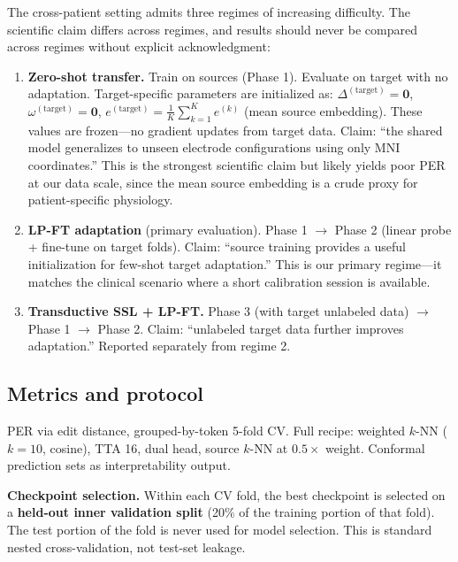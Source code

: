\documentclass[11pt,letterpaper]{article}
\begin{document}
The cross-patient setting admits three regimes of increasing difficulty. The scientific claim differs across regimes, and results should never be compared across regimes without explicit acknowledgment:

\begin{enumerate}[leftmargin=2em]
\item \textbf{Zero-shot transfer.} Train on sources (Phase 1). Evaluate on target with no adaptation. Target-specific parameters are initialized as: $\Delta^{(\text{target})} = \mathbf{0}$, $\omega^{(\text{target})} = \mathbf{0}$, $e^{(\text{target})} = \frac{1}{K}\sum_{k=1}^{K} e^{(k)}$ (mean source embedding). These values are frozen---no gradient updates from target data. Claim: ``the shared model generalizes to unseen electrode configurations using only MNI coordinates.'' This is the strongest scientific claim but likely yields poor PER at our data scale, since the mean source embedding is a crude proxy for patient-specific physiology.

\item \textbf{LP-FT adaptation} (primary evaluation). Phase 1 $\to$ Phase 2 (linear probe + fine-tune on target folds). Claim: ``source training provides a useful initialization for few-shot target adaptation.'' This is our primary regime---it matches the clinical scenario where a short calibration session is available.

\item \textbf{Transductive SSL + LP-FT.} Phase 3 (with target unlabeled data) $\to$ Phase 1 $\to$ Phase 2. Claim: ``unlabeled target data further improves adaptation.'' Reported separately from regime 2.
\end{enumerate}

\subsection{Metrics and protocol}

PER via edit distance, grouped-by-token 5-fold CV. Full recipe: weighted $k$-NN ($k{=}10$, cosine), TTA 16, dual head, source $k$-NN at $0.5\times$ weight. Conformal prediction sets as interpretability output.

\textbf{Checkpoint selection.} Within each CV fold, the best checkpoint is selected on a \textbf{held-out inner validation split} (20\% of the training portion of that fold). The test portion of the fold is never used for model selection. This is standard nested cross-validation, not test-set leakage.
\end{document}
